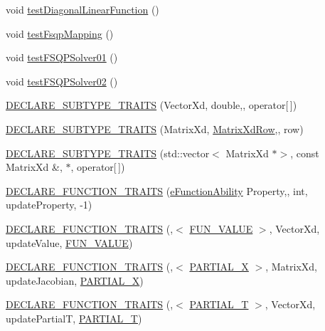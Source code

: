 \begin{DoxyCompactItemize}
void \hyperlink{namespaceocra_aca14a12e382291d2f3a2113ff1348432}{test\+Diagonal\+Linear\+Function} ()
\item 
void \hyperlink{namespaceocra_a8bf333a92a412aecd42bebe1b9befb93}{test\+Fsqp\+Mapping} ()
\item 
void \hyperlink{namespaceocra_a6841398f134f5638989988f887e7d529}{test\+F\+S\+Q\+P\+Solver01} ()
\item 
void \hyperlink{namespaceocra_a59323105067ef321d36ac86c6b4aaff8}{test\+F\+S\+Q\+P\+Solver02} ()
\item 
\hyperlink{namespaceocra_a1f55d05eac986f62fad9b7451d42159c}{D\+E\+C\+L\+A\+R\+E\+\_\+\+S\+U\+B\+T\+Y\+P\+E\+\_\+\+T\+R\+A\+I\+TS} (Vector\+Xd, double,, operator\mbox{[}$\,$\mbox{]})
\item 
\hyperlink{namespaceocra_a9122e70f2163c0c2400ac64524e21e34}{D\+E\+C\+L\+A\+R\+E\+\_\+\+S\+U\+B\+T\+Y\+P\+E\+\_\+\+T\+R\+A\+I\+TS} (Matrix\+Xd, \hyperlink{namespaceocra_a608bf0522317ed1df3bbfc6a5753bc01}{Matrix\+Xd\+Row},, row)
\item 
\hyperlink{namespaceocra_ae9616c1ac4732b558ee47b1191d9a4dd}{D\+E\+C\+L\+A\+R\+E\+\_\+\+S\+U\+B\+T\+Y\+P\+E\+\_\+\+T\+R\+A\+I\+TS} (std\+::vector$<$ Matrix\+Xd $\ast$$>$, const Matrix\+Xd \&, $\ast$, operator\mbox{[}$\,$\mbox{]})
\item 
\hyperlink{namespaceocra_a05e593130f943cba65d89cf9cbb1c890}{D\+E\+C\+L\+A\+R\+E\+\_\+\+F\+U\+N\+C\+T\+I\+O\+N\+\_\+\+T\+R\+A\+I\+TS} (\hyperlink{namespaceocra_a40ddbec106a6034cd2047bba9945b568}{e\+Function\+Ability} Property,, int, update\+Property, -\/1)
\item 
\hyperlink{namespaceocra_a824e1cafb06db3d3a54da47469c8e234}{D\+E\+C\+L\+A\+R\+E\+\_\+\+F\+U\+N\+C\+T\+I\+O\+N\+\_\+\+T\+R\+A\+I\+TS} (,$<$ \hyperlink{namespaceocra_a40ddbec106a6034cd2047bba9945b568acfb47b20329993093d2022b017239bd8}{F\+U\+N\+\_\+\+V\+A\+L\+UE} $>$, Vector\+Xd, update\+Value, \hyperlink{namespaceocra_a40ddbec106a6034cd2047bba9945b568acfb47b20329993093d2022b017239bd8}{F\+U\+N\+\_\+\+V\+A\+L\+UE})
\item 
\hyperlink{namespaceocra_af847bdc711cc6063b38424bb15f93af1}{D\+E\+C\+L\+A\+R\+E\+\_\+\+F\+U\+N\+C\+T\+I\+O\+N\+\_\+\+T\+R\+A\+I\+TS} (,$<$ \hyperlink{namespaceocra_a40ddbec106a6034cd2047bba9945b568a59fbb6697bc43c94e6e2842d89305b9c}{P\+A\+R\+T\+I\+A\+L\+\_\+X} $>$, Matrix\+Xd, update\+Jacobian, \hyperlink{namespaceocra_a40ddbec106a6034cd2047bba9945b568a59fbb6697bc43c94e6e2842d89305b9c}{P\+A\+R\+T\+I\+A\+L\+\_\+X})
\item 
\hyperlink{namespaceocra_a941058188be37876ac5416cc29f31e8b}{D\+E\+C\+L\+A\+R\+E\+\_\+\+F\+U\+N\+C\+T\+I\+O\+N\+\_\+\+T\+R\+A\+I\+TS} (,$<$ \hyperlink{namespaceocra_a40ddbec106a6034cd2047bba9945b568aad093a42d990b60ad0e74b89ab1697b1}{P\+A\+R\+T\+I\+A\+L\+\_\+T} $>$, Vector\+Xd, update\+PartialT, \hyperlink{namespaceocra_a40ddbec106a6034cd2047bba9945b568aad093a42d990b60ad0e74b89ab1697b1}{P\+A\+R\+T\+I\+A\+L\+\_\+T})
$$
\end{DoxyCompactItemize}

